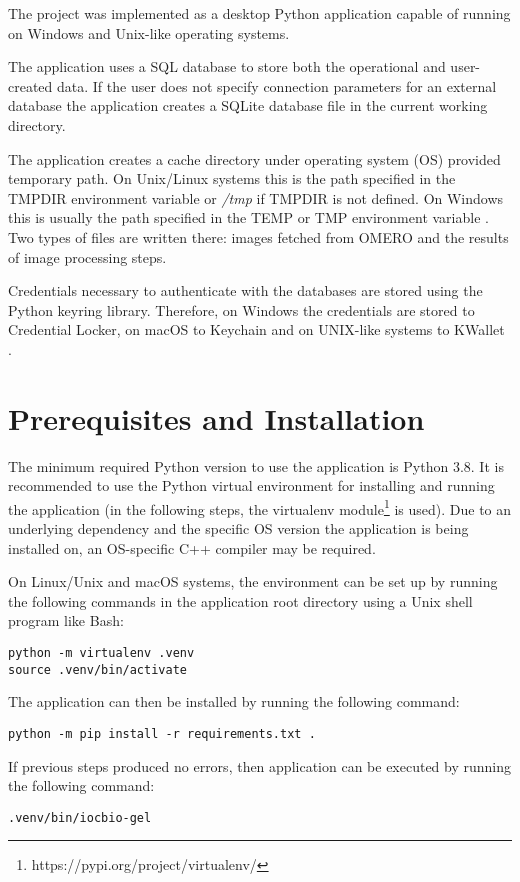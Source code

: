 The project was implemented as a desktop Python application capable of running on Windows and Unix-like operating systems. 

The application uses a SQL database to store both the operational and user-created data. If the user does not specify connection parameters for an external database the application creates a SQLite database file in the current working directory.

The application creates a cache directory under operating system (OS) provided temporary path. On Unix/Linux systems this is the path specified in the TMPDIR environment variable or \emph{/tmp} if TMPDIR is not defined. On Windows this is usually the path specified in the TEMP or TMP environment variable \cite{qt-dir}. Two types of files are written there: images fetched from OMERO and the results of image processing steps.

Credentials necessary to authenticate with the databases are stored using the Python keyring library. Therefore, on Windows the credentials are stored to Credential Locker, on macOS to Keychain and on UNIX-like systems to KWallet \cite{keyring}.

\section{Prerequisites and Installation}

The minimum required Python version to use the application is Python 3.8. It is recommended to use the Python virtual environment for installing and running the application (in the following steps, the virtualenv module\footnote{https://pypi.org/project/virtualenv/} is used). Due to an underlying dependency and the specific OS version the application is being installed on, an OS-specific C++ compiler may be required.

On Linux/Unix and macOS systems, the environment can be set up by running the following commands in the application root directory using a Unix shell program like Bash:
\begin{verbatim}
python -m virtualenv .venv 
source .venv/bin/activate
\end{verbatim}
The application can then be installed by running the following command:
\begin{verbatim}
python -m pip install -r requirements.txt .
\end{verbatim}
If previous steps produced no errors, then application can be executed by running the following command:
\begin{verbatim}
.venv/bin/iocbio-gel
\end{verbatim}

